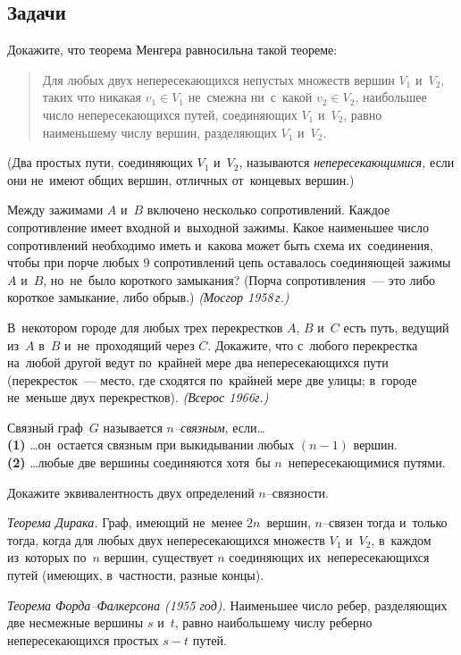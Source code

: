 \subsection*{Задачи}

\begin{problems}

\item
Докажите, что теорема Менгера равносильна такой теореме:
\begin{quote}
Для любых двух непересекающихся непустых множеств вершин $V_1$ и~$V_2$, таких
что никакая $v_1 \in V_1$ не~смежна ни~с~какой $v_2 \in V_2$, наибольшее число
непересекающихся путей, соединяющих $V_1$ и~$V_2$, равно наименьшему числу
вершин, разделяющих $V_1$ и~$V_2$.
\end{quote}
(Два простых пути, соединяющих $V_1$ и~$V_2$, называются
\emph{непересекающимися,} если они не~имеют общих вершин, отличных от~концевых
вершин.)

\item
Между зажимами $A$ и~$B$ включено несколько сопротивлений.
Каждое сопротивление имеет входной и~выходной зажимы.
Какое наименьшее число сопротивлений необходимо иметь и~какова может быть схема
их~соединения, чтобы при порче любых $9$ сопротивлений цепь оставалось
соединяющей зажимы $A$ и~$B$, но~не~было короткого замыкания?
(Порча сопротивления~--- это либо короткое замыкание, либо обрыв.)
\emph{(Мосгор 1958\,г.)}

\item
В~некотором городе для любых трех перекрестков $A$, $B$ и~$C$ есть путь,
ведущий из~$A$ в~$B$ и~не~проходящий через $C$.
Докажите, что с~любого перекрестка на~любой другой ведут по~крайней мере два
непересекающихся пути (перекресток~--- место, где сходятся по~крайней мере две
улицы; в~городе не~меньше двух перекрестков).
\emph{(Всерос 1966г.)}

\end{problems}

Связный граф~$G$ называется \emph{$n$--связным}, если\ldots
\\
\textbf{(1)}
\ldots он~остается связным при выкидывании любых $(n - 1)$ вершин.
\\
\textbf{(2)}
\ldots любые две вершины соединяются хотя~бы $n$~непересекающимися путями.

\begin{problems}

\item
Докажите эквивалентность двух определений $n$--связности.

\item\emph{Теорема Дирака.}
Граф, имеющий не~менее $2 n$~вершин, $n$--связен тогда и~только тогда, когда
для любых двух непересекающихся множеств $V_1$ и~$V_2$, в~каждом из~которых
по~$n$ вершин, существует $n$ соединяющих их~непересекающихся путей (имеющих,
в~частности, разные концы).

\item\emph{Теорема Форда--Фалкерсона (1955 год).}
Наименьшее число ребер, разделяющих две несмежные вершины $s$ и~$t$, равно
наибольшему числу реберно непересекающихся простых $s {-} t$ путей.

\end{problems}

